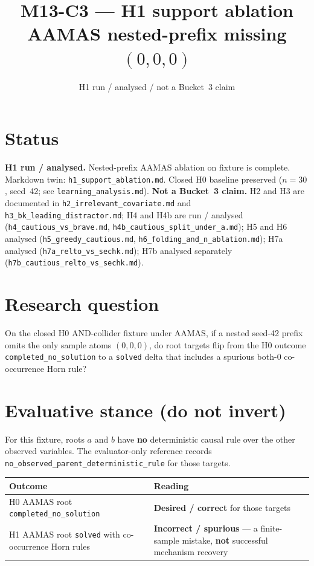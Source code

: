 \documentclass[11pt]{article}
\title{M13-C3 --- H1 support ablation\\
AAMAS nested-prefix missing \((0,0,0)\)}
\author{}
\date{H1 run / analysed / not a Bucket~3 claim}
\begin{document}
\maketitle

\section{Status}

\textbf{H1 run / analysed.}
Nested-prefix AAMAS ablation on fixture
 is complete.
Markdown twin: \texttt{h1\_support\_ablation.md}.
Closed H0 baseline preserved (\(n{=}30\), seed~42; see
\texttt{learning\_analysis.md}).
\textbf{Not a Bucket~3 claim.}
H2 and H3 are documented in \texttt{h2\_irrelevant\_covariate.md} and
\texttt{h3\_bk\_leading\_distractor.md}; H4 and H4b are run / analysed
(\texttt{h4\_cautious\_vs\_brave.md},
\texttt{h4b\_cautious\_split\_under\_a.md}); H5 and H6 analysed
(\texttt{h5\_greedy\_cautious.md}, \texttt{h6\_folding\_and\_n\_ablation.md});
H7a analysed (\texttt{h7a\_relto\_vs\_sechk.md}); H7b analysed separately
(\texttt{h7b\_cautious\_relto\_vs\_sechk.md}).

\section{Research question}

On the closed H0 AND-collider fixture under AAMAS, if a nested seed-42 prefix
omits the only sample atoms \((0,0,0)\), do root targets flip from the H0
outcome \texttt{completed\_no\_solution} to a \texttt{solved} delta that includes
a spurious both-0 co-occurrence Horn rule?

\section{Evaluative stance (do not invert)}

For this fixture, roots \(a\) and \(b\) have \textbf{no} deterministic causal
rule over the other observed variables.
The evaluator-only reference records
\texttt{no\_observed\_parent\_deterministic\_rule} for those targets.

\begin{center}
\begin{tabular}{@{}L{0.46\textwidth}L{0.44\textwidth}@{}}
\toprule
Outcome & Reading \\
\midrule
H0 AAMAS root \texttt{completed\_no\_solution} &
  \textbf{Desired / correct} for those targets \\
H1 AAMAS root \texttt{solved} with co-occurrence Horn rules &
  \textbf{Incorrect / spurious} --- a finite-sample mistake, \textbf{not}
  successful mechanism recovery \\
\bottomrule
\end{tabular}
\end{center}
\end{document}
